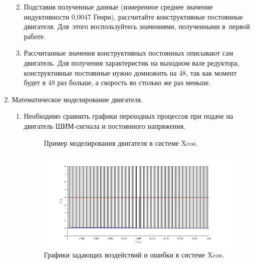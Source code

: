 \documentclass[12pt,a4paper,openany]{extarticle}
\begin{document}
\begin{enumerate}
\begin{enumerate}
\begin{figure}[h]
	\end{figure}
	\item Подставив полученные данные (измеренное среднее значение индуктивности 0,0047 Генри), рассчитайте конструктивные постоянные двигателя. Для~этого воспользуйтесь значениями, полученными в~первой работе.
	\item Рассчитанные значения конструктивных постоянных описывают сам двигатель. Для получения характеристик на выходном вале редуктора, конструктивные постоянные нужно домножить на 48, так как момент будет в 48 раз больше, а скорость во столько же раз меньше.
\end{enumerate}
\item Математическое моделирование двигателя.
	\begin{enumerate}
	\item Необходимо сравнить графики переходных процессов при подаче на двигатель ШИМ-сигнала и постоянного напряжения.
	\begin{figure}[h]
		\noindent{}
		\caption{Пример моделирования двигателя в системе Xcos.}
		\label{fig:transmition}
	\end{figure}
	
	\begin{figure}[h]
		\noindent\centering\H{
			\includegraphics[scale=0.55]{2models.jpeg}
		}
		\caption{Графики задающих воздействий и ошибки в системе Xcos.}
		\label{fig:transmition}
	\end{figure}
	
	\end{enumerate}
\end{enumerate}
\end{document}
